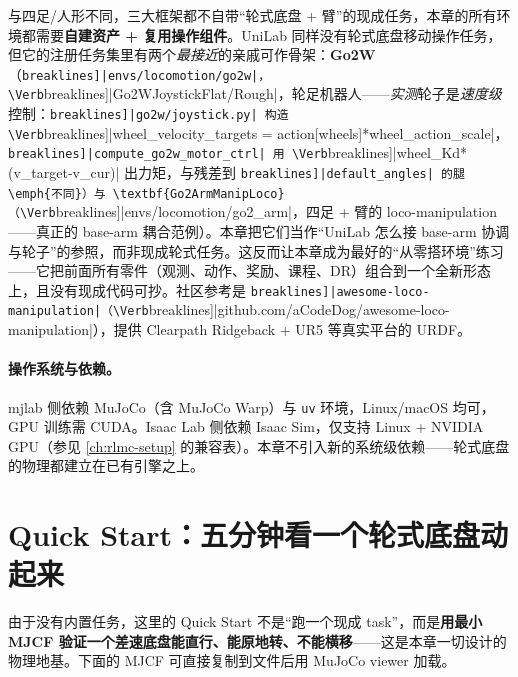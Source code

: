 \begin{note}
与四足/人形不同，三大框架都不自带“轮式底盘 + 臂”的现成任务，本章的所有环境都需要\textbf{自建资产 + 复用操作组件}。UniLab 同样没有轮式底盘移动操作任务，但它的注册任务集里有两个\emph{最接近}的亲戚可作骨架：\textbf{Go2W}（\Verb[breaklines]|envs/locomotion/go2w|，\Verb[breaklines]|Go2WJoystickFlat/Rough|，轮足机器人——\emph{实测}轮子是\emph{速度级}控制：\Verb[breaklines]|go2w/joystick.py| 构造 \Verb[breaklines]|wheel_velocity_targets = action[wheels]*wheel_action_scale|，\Verb[breaklines]|compute_go2w_motor_ctrl| 用 \Verb[breaklines]|wheel_Kd*(v_target-v_cur)| 出力矩，与残差到 \Verb[breaklines]|default_angles| 的腿\emph{不同}）与 \textbf{Go2ArmManipLoco}（\Verb[breaklines]|envs/locomotion/go2_arm|，四足 + 臂的 loco-manipulation——真正的 base-arm 耦合范例）。本章把它们当作“UniLab 怎么接 base-arm 协调与轮子”的参照，而非现成轮式任务。这反而让本章成为最好的“从零搭环境”练习——它把前面所有零件（观测、动作、奖励、课程、DR）组合到一个全新形态上，且没有现成代码可抄。社区参考是 \Verb[breaklines]|awesome-loco-manipulation|（\Verb[breaklines]|github.com/aCodeDog/awesome-loco-manipulation|），提供 Clearpath Ridgeback + UR5 等真实平台的 URDF。
\end{note}

\paragraph{操作系统与依赖。}mjlab 侧依赖 MuJoCo（含 MuJoCo Warp）与 \verb|uv| 环境，Linux/macOS 均可，GPU 训练需 CUDA。Isaac Lab 侧依赖 Isaac Sim，仅支持 Linux + NVIDIA GPU（参见 \cref{ch:rlmc-setup} 的兼容表）。本章不引入新的系统级依赖——轮式底盘的物理都建立在已有引擎之上。

\section{Quick Start：五分钟看一个轮式底盘动起来}
\label{sec:rlmc-wh-quickstart}

由于没有内置任务，这里的 Quick Start 不是“跑一个现成 task”，而是\textbf{用最小 MJCF 验证一个差速底盘能直行、能原地转、不能横移}——这是本章一切设计的物理地基。下面的 MJCF 可直接复制到文件后用 MuJoCo viewer 加载。

